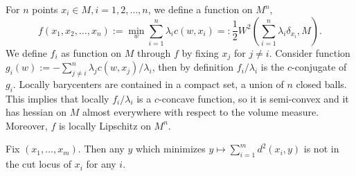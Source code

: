 For $n$ points $x_i \in M, i=1,2,\ldots,n$, we define a function on $M^n$,
\[
	f(x_1, x_2, \ldots, x_n) := \min_{w} \sum_{i=1}^n \lambda_i c(w, x_i) =: \frac{1}{2}W^2(\sum_{i=1}^n \lambda_i \delta_{x_i}, M).
\]
We define $f_i$ as function on $M$ through $f$ by fixing $x_j$ for $j \neq i$.
Consider function $g_i(w) := -\sum_{j\neq i}^n \lambda_j c(w, x_j) / \lambda_i$,
then by definition $f_i /\lambda_i$ is the $c$-conjugate of $g_i$.
Locally barycenters are contained in a compact set, a union of $n$ closed balls.
This implies that locally $f_i / \lambda_i $ is a $c$-concave function,
so it is semi-convex and it has hessian on $M$ almost everywhere with respect to the volume measure.
Moreover, $f$ is locally Lipschitz on $M^n$.

\begin{lem}
	Fix \( \left( x _ { 1 } , \ldots , x _ { m } \right)\).
	Then any \( y \) which minimizes \( y \mapsto \sum _ { i = 1 } ^ { m } d ^ { 2 } \left( x _ { i } , y \right) \) is not in the cut locus of \( x _ { i } \) for any \( i . \)
\end{lem}

